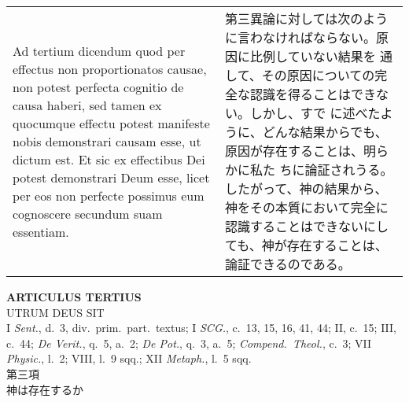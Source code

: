 \documentclass[10pt]{jsarticle}
\begin{document}
\begin{longtable}{p{21em}p{21em}}
\\



{\sc Ad tertium dicendum} quod per effectus non proportionatos causae,
non potest perfecta cognitio de causa haberi, sed tamen ex quocumque
effectu potest manifeste nobis demonstrari causam esse, ut dictum
est. Et sic ex effectibus Dei potest demonstrari Deum esse, licet per
eos non perfecte possimus eum cognoscere secundum suam essentiam.

&


第三異論に対しては次のように言わなければならない。原因に比例していない結果を
通して、その原因についての完全な認識を得ることはできない。しかし、すで
 に述べたように、どんな結果からでも、原因が存在することは、明らかに私た
 ちに論証されうる。したがって、神の結果から、神をその本質において完全に
 認識することはできないにしても、神が存在することは、論証できるのである。



\end{longtable}

\newpage
{}
\begin{center}
 {\Large {\bf ARTICULUS TERTIUS}}\\
 {\large UTRUM DEUS SIT}\\
 {\footnotesize I {\it Sent.}, d.~3, div.~prim.~part.~textus; I {\it
 SCG.}, c.~13, 15, 16, 41, 44; II, c.~15; III, c.~44; {\it De Verit.},
 q.~5, a.~2; {\it De Pot.}, q.~3, a.~5; {\it Compend.~Theol.}, c.~3; VII
 {\it Physic.}, l.~2; VIII, l.~9 sqq.; XII {\it Metaph.}, l.~5 sqq.}\\
 {\Large 第三項\\神は存在するか}
\end{center}
\end{document}
